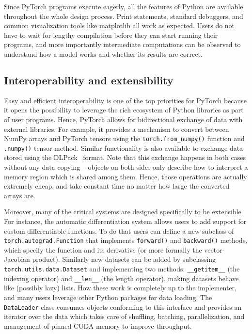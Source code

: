 Since PyTorch programs execute eagerly, all the features of Python are available throughout the whole design process. Print statements, standard debuggers, and common visualization tools like matplotlib all work as expected. Users do not have to wait for lengthy compilation before they can start running their programs, and more importantly intermediate computations can be observed to understand how a model works and whether its results are correct.

\subsection{Interoperability and extensibility}

Easy and efficient interoperability is one of the top priorities for PyTorch because it opens the possibility to leverage the rich ecosystem of Python libraries as part of user programs. Hence, PyTorch allows for bidirectional exchange of data with external libraries.
For example, it provides a mechanism to convert between NumPy arrays and PyTorch tensors using the \lstinline{torch.from_numpy()} function and \lstinline{.numpy()} tensor method. Similar functionality is also available to exchange data stored using the DLPack~\cite{dlpack} format.
Note that this exchange happens in both cases without any data copying -- objects on both sides only describe how to interpret a memory region which is shared among them.
Hence, those operations are actually extremely cheap, and take constant time no matter how large the converted arrays are.

Moreover, many of the critical systems are designed specifically to be extensible.
For instance, the automatic differentiation system allows users to add support for custom differentiable functions. To do that users can define a new subclass of \lstinline{torch.autograd.Function} that implements \lstinline{forward()} and \lstinline{backward()} methods, which specify the function and its derivative (or more formally the vector-Jacobian product).
Similarly new datasets can be added by subclassing \lstinline|torch.utils.data.Dataset|
and implementing two methods: \lstinline{__getitem__} (the indexing operator) and \lstinline{__len__} (the length operator), making datasets behave like (possibly lazy) lists. How these work is completely up to the implementer, and many users leverage other Python packages for data loading.
The \lstinline{DataLoader} class consumes objects conforming to this interface and provides an iterator over the data which takes care of shuffling, batching, parallelization, and management of pinned CUDA memory to improve throughput.

